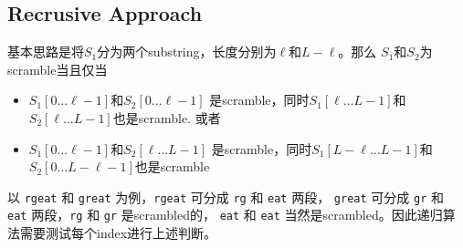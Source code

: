 \subsection{Recrusive Approach}
\begin{CJK*}{UTF8}{gbsn}
基本思路是将$S_1$分为两个substring，长度分别为$\ell$和$L-\ell$。那么 $S_1$和$S_2$为scramble当且仅当
\begin{itemize}
\item $S_1[0\ldots\ell-1]$和$S_2[0\ldots \ell-1]$ 是scramble，同时$S_1[\ell\ldots L-1]$和$S_2[\ell\ldots L-1]$也是scramble. 或者
\item $S_1[0\ldots\ell-1]$和$S_2[\ell\ldots L-1]$ 是scramble，同时$S_1[L-\ell\ldots L-1]$和$S_2[0\ldots L-\ell-1]$也是scramble
\end{itemize} 
以 \texttt{rgeat} 和 \texttt{great} 为例，\texttt{rgeat} 可分成 \texttt{rg} 和 \texttt{eat} 两段， \texttt{great} 可分成 \texttt{gr} 和 \texttt{eat} 两段，\texttt{rg} 和 \texttt{gr} 是scrambled的， \texttt{eat} 和 \texttt{eat} 当然是scrambled。因此递归算法需要测试每个index进行上述判断。
\end{CJK*}
